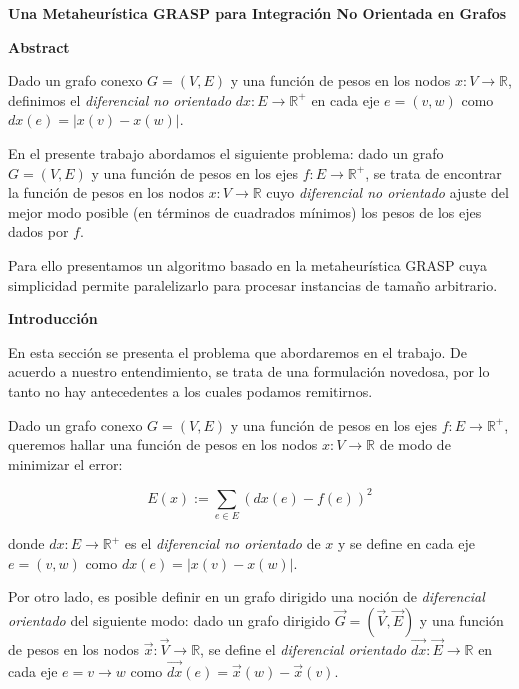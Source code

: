 \documentclass[a4paper,11pt]{article}
\begin{document}
\textbf{Una Metaheurística GRASP para Integración No Orientada en Grafos}

\bigskip

\textbf{Abstract}
 
\bigskip

Dado un grafo conexo $G=(V,E)$ y una función de pesos en los nodos $x: V 
\rightarrow \mathbb{R}$, definimos el \textit{diferencial no orientado} 
$dx: E \rightarrow \mathbb{R}^+$ en cada eje $e=(v,w)$ como $dx(e) = 
|x(v) - x(w)|$.

\smallskip

En el presente trabajo abordamos el siguiente problema: dado un grafo 
$G=(V,E)$ y una función de pesos en los ejes $f: E \rightarrow 
\mathbb{R}^+$, se trata de encontrar la función de pesos en los nodos 
$x: V \rightarrow \mathbb{R}$ cuyo \textit{diferencial no orientado} 
ajuste del mejor modo posible (en términos de cuadrados mínimos) los 
pesos de los ejes dados por $f$.

\smallskip

Para ello presentamos un algoritmo basado en la metaheurística GRASP 
cuya simplicidad permite paralelizarlo para procesar instancias de 
tamaño arbitrario.

\bigskip

\textbf{Introducción}

\bigskip

En esta sección se presenta el problema que abordaremos en el trabajo. 
De acuerdo a nuestro entendimiento, se trata de una formulación 
novedosa, por lo tanto no hay antecedentes a los cuales podamos 
remitirnos.

\bigskip

Dado un grafo conexo $G=(V,E)$ y una función de pesos en los ejes 
$f: E \rightarrow \mathbb{R}^+$, queremos hallar una función de pesos 
en los nodos $x: V \rightarrow \mathbb{R}$ de modo de minimizar el 
error:

$$E(x) := \sum_{e \in E} (dx(e) - f(e))^2$$

donde $dx: E \rightarrow \mathbb{R}^+$ es el \textit{diferencial 
no orientado} de $x$ y se define en cada eje $e=(v,w)$ como $dx(e) = 
|x(v) - x(w)|$.

\bigskip

Por otro lado, es posible definir en un grafo dirigido una noción de 
\textit{diferencial orientado} del siguiente modo: dado un grafo 
dirigido $\vec G=(\vec V,\vec E)$ y una función de pesos en los nodos 
$\vec x: \vec V \rightarrow \mathbb{R}$, se define el 
\textit{diferencial orientado} $\vec{dx}: \vec E \rightarrow \mathbb{R}$ 
en cada eje $e=v \rightarrow w$ como $\vec{dx}(e) = \vec x(w) - 
\vec x(v)$.
\end{document}
